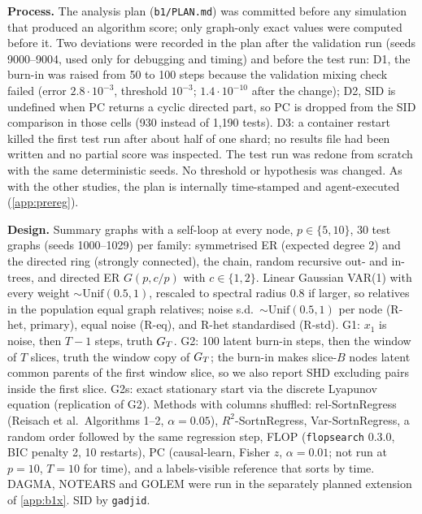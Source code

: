 \textbf{Process.} The analysis plan (\texttt{b1/PLAN.md}) was committed before
any simulation that produced an algorithm score; only graph-only exact values
were computed before it. Two deviations were recorded in the plan after the
validation run (seeds 9000--9004, used only for debugging and timing) and
before the test run: D1, the burn-in was raised from 50 to 100 steps because
the validation mixing check failed (error $2.8\cdot10^{-3}$, threshold
$10^{-3}$; $1.4\cdot10^{-10}$ after the change); D2, SID is undefined when PC
returns a cyclic directed part, so PC is dropped from the SID comparison in
those cells (930 instead of 1{,}190 tests). D3: a container restart killed the
first test run after about half of one shard; no results file had been
written and no partial score was inspected. The test run was redone from
scratch with the same deterministic seeds. No threshold or hypothesis was
changed. As with the other studies, the plan is internally time-stamped and
agent-executed (\cref{app:prereg}).

\textbf{Design.} Summary graphs with a self-loop at every node, $p\in\{5,10\}$,
30 test graphs (seeds 1000--1029) per family: symmetrised ER (expected degree
2) and the directed ring (strongly connected), the chain, random recursive
out- and in-trees, and directed ER $G(p,c/p)$ with $c\in\{1,2\}$. Linear
Gaussian VAR(1) with every weight $\sim\mathrm{Unif}(0.5,1)$, rescaled to
spectral radius $0.8$ if larger, so relatives in the population equal graph
relatives; noise s.d.\ $\sim\mathrm{Unif}(0.5,1)$ per node (R-het, primary),
equal noise (R-eq), and R-het standardised (R-std). G1: $x_1$ is noise, then
$T-1$ steps, truth $G_T$. G2: 100 latent burn-in steps, then the window of
$T$ slices, truth the window copy of $G_T$; the burn-in makes slice-$B$ nodes
latent common parents of the first window slice, so we also report SHD
excluding pairs inside the first slice. G2s: exact stationary start via the
discrete Lyapunov equation (replication of G2). Methods with columns shuffled:
rel-SortnRegress (Reisach et al.\ Algorithms 1--2, $\alpha=0.05$),
$R^2$-SortnRegress, Var-SortnRegress, a random order followed by the same
regression step, FLOP (\texttt{flopsearch} 0.3.0, BIC penalty 2, 10 restarts),
PC (causal-learn, Fisher $z$, $\alpha=0.01$; not run at $p=10$, $T=10$ for
time), and a labels-visible reference that sorts by time. DAGMA, NOTEARS and
GOLEM were run in the separately planned extension of \cref{app:b1x}. SID by
\texttt{gadjid}.

